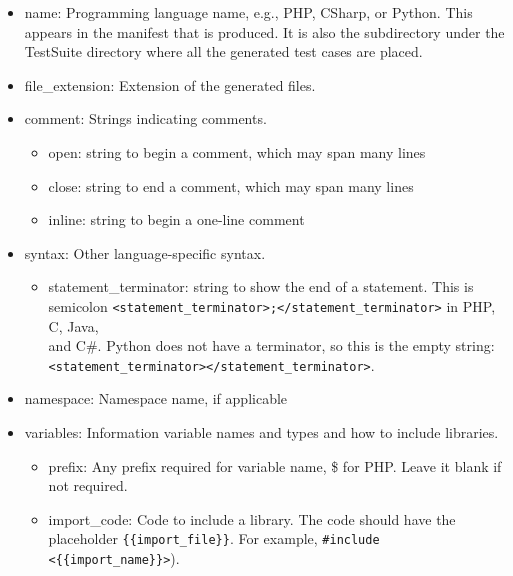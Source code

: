 \documentclass[12pt]{article}
\newcommand{\CSharp}{C{\fontseries{b}\selectfont\#}}
\begin{document}
\begin{itemize}
    \item name: Programming language name, e.g., PHP, CSharp, 
    or Python. This appears in the manifest that is produced.
    It is also the subdirectory under the TestSuite directory 
    where all the generated test cases are placed.

    \item file\_extension: Extension of the generated files.

    \item comment: Strings indicating comments.
    \begin{itemize}
        \item open: string to begin a comment, which may span many lines
        \item close: string to end a comment, which may span many lines
        \item inline: string to begin a one-line comment
    \end{itemize}
    
    \item syntax: Other language-specific syntax.
    \begin{itemize}
        \item statement\_terminator: string to show the end of 
        a statement.
        This is semicolon
        \verb|<statement_terminator>;</statement_terminator>|
        in PHP, C, Java, \\ and \CSharp. Python does not have 
        a terminator, so this is the empty string: \\
        \verb|<statement_terminator></statement_terminator>|.
    \end{itemize}
    
    \item namespace: Namespace name, if applicable

    \item variables: Information variable names and types and how
    to include libraries.
    \begin{itemize}
        \item prefix: Any prefix required for variable name, 
        \$ for PHP.
        Leave it blank if not required.

        \item import\_code: Code to include a library. The code
        should have the placeholder \verb|{{import_file}}|.
        For example, \verb|#include <{{import_name}}>|).
        

\end{itemize}
\end{itemize}
\end{document}
